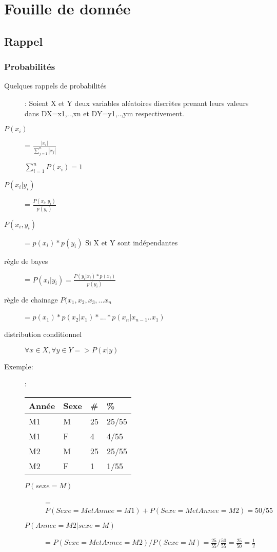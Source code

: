 \part{Fouille de donnée}
\pagebreak

\chapter{Rappel}
\section{Probabilités}
\begin{description}
\item[Quelques rappels de probabilités]: Soient X et Y deux variables aléatoires discrètes prenant leurs valeurs dans DX={x1,..,xn} et DY={y1,..,ym} respectivement.  
\item[$P(x_i)$] = $\frac{|x_i|}{\sum_{j=1}^n |x_j|}$
\item[] $\sum_{i=1}^n P(x_i) = 1$
\item[$P(x_i | y_i)$] = $\frac{P(x_i,y_i)}{p(y_i)}$
\item[$P(x_i,y_i)$] = $p(x_i) * p(y_i)$ Si X et Y sont indépendantes
\item[règle de bayes] = $P(x_i|y_i) = \frac{P(y_i|x_i)*p(x_i)}{p(y_i)}$
\item[règle de chainage $P(x_1,x_2,x_3,...x_n$] = $p(x_1)*p(x_2|x_1)*...*p(x_n|x_{n-1}..x_1)$
\item[distribution conditionnel] $ \forall x \in X, \forall y \in Y => P(x|y)$
\end{description}

Exemple:
\begin{description}
\item[]: 
\begin{tabular}{ll|ll}
  \hline
  Année & Sexe & \# & \%  \\
  \hline
   M1 & M  & 25  &  25/55   \\
   M1 & F  & 4 &  4/55  \\
   M2 & M  & 25  & 25/55   \\
   M2 & F  & 1  &  1/55  \\
  \hline
\end{tabular}
\item[]
\begin{description}
\item[$P(sexe=M)$] = $P(Sexe=M et Annee=M1) + P(Sexe=M et Annee=M2) = 50/55$
\item[$P(Annee=M2 | sexe=M)$] = $P(Sexe=M et Annee=M2) / P(Sexe=M) = \frac{25}{55} / \frac{50}{55} = \frac{25}{50} = \frac{1}{2}$
\end{description}
\end{description}

